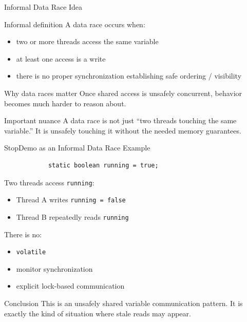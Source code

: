 \documentclass[aspectratio=169,11pt]{beamer}
\begin{document}
	\begin{frame}{Informal Data Race Idea}
		\begin{block}{Informal definition}
			A data race occurs when:
			\begin{itemize}
				\item two or more threads access the same variable
				\item at least one access is a write
				\item there is no proper synchronization establishing safe ordering / visibility
			\end{itemize}
		\end{block}
		
		\vspace{0.3cm}
		
		\begin{alertblock}{Why data races matter}
			Once shared access is unsafely concurrent, behavior becomes much harder to reason about.
		\end{alertblock}
		
		\vspace{0.25cm}
		
		\begin{exampleblock}{Important nuance}
			A data race is not just “two threads touching the same variable.”  
			It is unsafely touching it without the needed memory guarantees.
		\end{exampleblock}
	\end{frame}
	
	\begin{frame}[fragile]{StopDemo as an Informal Data Race Example}
		\begin{lstlisting}
			static boolean running = true;
		\end{lstlisting}
		
		Two threads access \texttt{running}:
		
		\begin{itemize}
			\item Thread A writes \texttt{running = false}
			\item Thread B repeatedly reads \texttt{running}
		\end{itemize}
		
		\vspace{0.3cm}
		
		There is no:
		\begin{itemize}
			\item \texttt{volatile}
			\item monitor synchronization
			\item explicit lock-based communication
		\end{itemize}
		
		\vspace{0.3cm}
		
		\begin{alertblock}{Conclusion}
			This is an unsafely shared variable communication pattern.  
			It is exactly the kind of situation where stale reads may appear.
		\end{alertblock}
	\end{frame}
	
\end{document}
